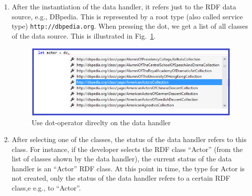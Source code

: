 \documentclass{llncs} %
\begin{document}
\begin{enumerate}
	\item After the instantiation of the data handler, it refers just
	       to the RDF data source, e.g., DBpedia. This is represented
	   by a root type (also called service type) \texttt{http://dbpedia.org}.
		  When pressing the dot, we get a list of all  classes of the data source.
			This is illustrated in Fig.~\ref{fig:showClass}.
			\begin{figure}[h]
				\centering
			\includegraphics[width=0.99\linewidth]{./figs/getClass.png}
			\caption{Use dot-operator direclty on the data handler}
			\label{fig:showClass}
			\end{figure}
	\item After selecting one of the classes, the status of the data handler refers to this class.
	    For instance, if the developer selects the RDF class ``Actor'' (from the list of classes shown by the data handler),
			the current status of the data handler is an ``Actor'' RDF class.
			At this point in time, the type for Actor is not created, only the status of
			the data handler refers to a certain RDF class,e e.g., to ``Actor''.
			

\end{enumerate}
\end{document}
